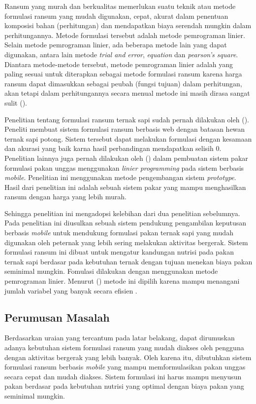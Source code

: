 Ransum yang murah dan berkualitas memerlukan suatu teknik atau metode formulasi ransum yang mudah digunakan, cepat, akurat dalam penentuan komposisi bahan (perhitungan) dan mendapatkan biaya serendah mungkin dalam perhitungannya. Metode formulasi tersebut adalah metode pemrograman linier. Selain metode pemrograman linier, ada beberapa metode lain yang dapat digunakan, antara lain metode \textit{trial and error}, \textit{equation} dan \textit{pearson’s square}. Diantara metode-metode tersebut, metode pemrograman linier adalah yang paling sesuai untuk diterapkan sebagai metode formulasi ransum karena harga ransum dapat dimasukkan sebagai peubah (fungsi tujuan) dalam perhitungan, akan tetapi dalam perhitungannya secara menual metode ini masih dirasa sangat sulit (\cite{Kusnandar2004}).

Penelitian tentang formulasi ransum ternak sapi sudah pernah dilakukan oleh \citeauthor{Rahman2017} (\cite*{Rahman2017}). Peneliti membuat sistem formulasi ransum berbasis web dengan batasan hewan ternak sapi potong. Sistem tersebut dapat melakukan formulasi dengan kesamaan dan akurasi yang baik karna hasil perbandingan mendapatkan selisih 0. Penelitian lainnya juga pernah dilakukan oleh \citeauthor{Muzayyanah2013} (\cite*{Muzayyanah2013}) dalam pembuatan sistem pakar formulasi pakan unggas menggunakan \textit{linier programming} pada sistem berbasis \textit{mobile}. Penelitian ini menggunakan metode pengembangan sistem \textit{prototype}. Hasil dari penelitian ini adalah sebuah sistem pakar yang mampu menghasilkan ransum dengan harga yang lebih murah.

Sehingga penelitian ini mengadopsi kelebihan dari dua penelitian sebelumnya. Pada penelitian ini diusulkan sebuah sistem pendukung pengambilan keputusan berbasis \textit{mobile} untuk mendukung formulasi pakan ternak sapi yang mudah digunakan oleh peternak yang lebih sering melakukan aktivitas bergerak. Sistem formulasi ransum ini dibuat untuk mengatur kandungan nutrisi pada pakan ternak sapi berdasar pada kebutuhan ternak dengan tujuan menekan biaya pakan seminimal mungkin. Fomulasi dilakukan dengan menggunakan metode pemrograman linier. Menurut \citeauthor{Muzayyanah2013} (\cite*{Muzayyanah2013}) metode ini dipilih karena mampu menangani jumlah variabel yang banyak secara efisien . 

\subsection*{Perumusan Masalah}
Berdasarkan uraian yang tercantum pada latar belakang, dapat dirumuskan adanya kebutuhan sistem formulasi ransum yang mudah diakses oleh pengguna dengan aktivitas bergerak yang lebih banyak. Oleh karena itu, dibutuhkan sistem formulasi ransum berbasis \textit{mobile} yang mampu memformulasikan pakan unggas secara cepat dan mudah diakses. Sistem formulasi ini harus mampu menyusun pakan berdasar pada kebutuhan nutrisi yang optimal dengan biaya pakan yang seminimal mungkin.

